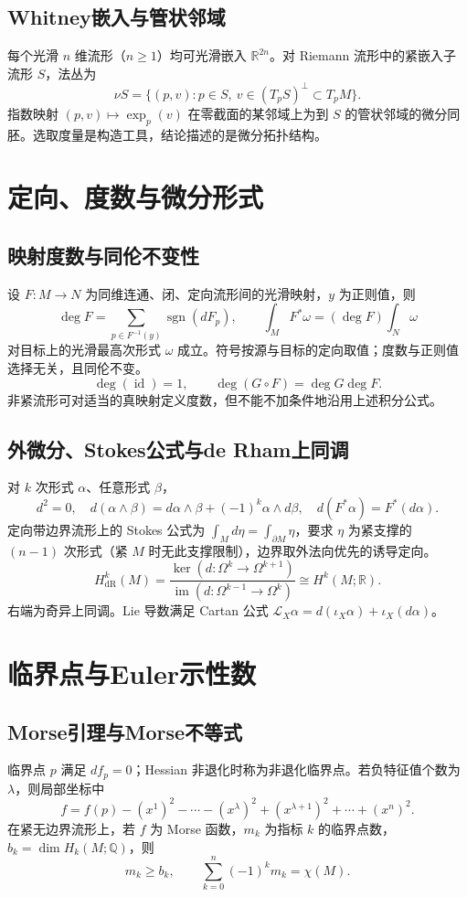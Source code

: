 \documentclass[../main.tex]{subfiles}
\begin{document}
\subsection{Whitney嵌入与管状邻域}
每个光滑 $n$ 维流形（$n\ge1$）均可光滑嵌入 $\mathbb R^{2n}$。对 Riemann 流形中的紧嵌入子流形 $S$，法丛为
\[
\nu S=\{(p,v):p\in S,\ v\in(T_pS)^\perp\subset T_pM\}.
\]
指数映射 $(p,v)\mapsto\exp_p(v)$ 在零截面的某邻域上为到 $S$ 的管状邻域的微分同胚。选取度量是构造工具，结论描述的是微分拓扑结构。
\section{定向、度数与微分形式}
\subsection{映射度数与同伦不变性}
设 $F:M\to N$ 为同维连通、闭、定向流形间的光滑映射，$y$ 为正则值，则
\[
\deg F=\sum_{p\in F^{-1}(y)}\operatorname{sgn}(dF_p),
\qquad \int_MF^*\omega=(\deg F)\int_N\omega
\]
对目标上的光滑最高次形式 $\omega$ 成立。符号按源与目标的定向取值；度数与正则值选择无关，且同伦不变。
\[
\deg(\operatorname{id})=1,\qquad\deg(G\circ F)=\deg G\deg F.
\]
非紧流形可对适当的真映射定义度数，但不能不加条件地沿用上述积分公式。
\subsection{外微分、Stokes公式与de Rham上同调}
对 $k$ 次形式 $\alpha$、任意形式 $\beta$，
\[
d^2=0,\quad d(\alpha\wedge\beta)=d\alpha\wedge\beta+(-1)^k\alpha\wedge d\beta,
\quad d(F^*\alpha)=F^*(d\alpha).
\]
定向带边界流形上的 Stokes 公式为 $\int_Md\eta=\int_{\partial M}\eta$，要求 $\eta$ 为紧支撑的 $(n-1)$ 次形式（紧 $M$ 时无此支撑限制），边界取外法向优先的诱导定向。
\[
H^k_{\mathrm{dR}}(M)=\frac{\ker(d:\Omega^k\to\Omega^{k+1})}{\operatorname{im}(d:\Omega^{k-1}\to\Omega^k)}
\cong H^k(M;\mathbb R).
\]
右端为奇异上同调。Lie 导数满足 Cartan 公式 $\mathcal L_X\alpha=d(\iota_X\alpha)+\iota_X(d\alpha)$。
\section{临界点与Euler示性数}
\subsection{Morse引理与Morse不等式}
临界点 $p$ 满足 $df_p=0$；Hessian 非退化时称为非退化临界点。若负特征值个数为 $\lambda$，则局部坐标中
\[
f=f(p)-(x^1)^2-\cdots-(x^\lambda)^2
+(x^{\lambda+1})^2+\cdots+(x^n)^2.
\]
在紧无边界流形上，若 $f$ 为 Morse 函数，$m_k$ 为指标 $k$ 的临界点数，$b_k=\dim H_k(M;\mathbb Q)$，则
\[
m_k\ge b_k,\qquad\sum_{k=0}^n(-1)^km_k=\chi(M).
\]
\end{document}
